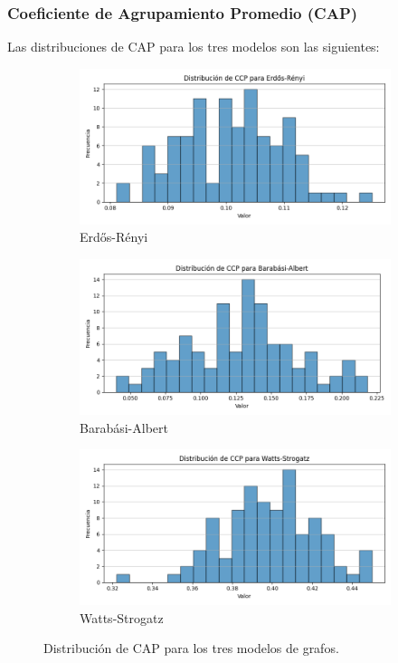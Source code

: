 \documentclass[12pt]{book}
\begin{document}
\subsubsection{Coeficiente de Agrupamiento Promedio (CAP)}
Las distribuciones de CAP para los tres modelos son las siguientes:
\begin{figure}[ht!]
\centering
\begin{subfigure}{.32\textwidth}
  \centering
  \includegraphics[width=\linewidth]{images/CCP_er.png}
  \caption{Erdős-Rényi}
\end{subfigure}%
\begin{subfigure}{.32\textwidth}
  \centering
  \includegraphics[width=\linewidth]{images/CCP_ba.png}
  \caption{Barabási-Albert}
\end{subfigure}
\begin{subfigure}{.32\textwidth}
  \centering
  \includegraphics[width=\linewidth]{images/CCP_ws.png}
  \caption{Watts-Strogatz}
\end{subfigure}
\caption{Distribución de CAP para los tres modelos de grafos.}
\end{figure}
\end{document}
